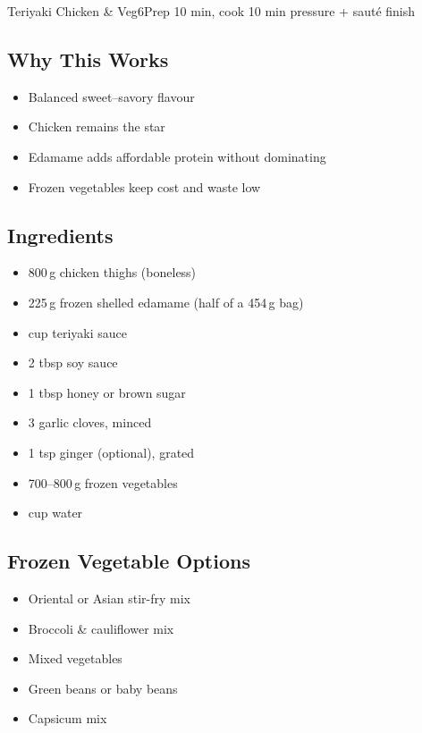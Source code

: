 \begin{recipebox}{Teriyaki Chicken \& Veg}{6}{Prep 10 min, cook 10 min pressure + sauté finish}
\subsection*{Why This Works}
\begin{itemize}
    \item Balanced sweet--savory flavour
    \item Chicken remains the star
    \item Edamame adds affordable protein without dominating
    \item Frozen vegetables keep cost and waste low
\end{itemize}

\subsection*{Ingredients}
\begin{itemize}
    \item 800\,g chicken thighs (boneless)
    \item 225\,g frozen shelled edamame (half of a 454\,g bag)
    \item {} cup teriyaki sauce
    \item 2 tbsp soy sauce
    \item 1 tbsp honey or brown sugar
    \item 3 garlic cloves, minced
    \item 1 tsp ginger (optional), grated
    \item 700--800\,g frozen vegetables
    \item {} cup water
\end{itemize}

\subsection*{Frozen Vegetable Options}
\begin{itemize}
    \item Oriental or Asian stir-fry mix
    \item Broccoli \& cauliflower mix
    \item Mixed vegetables
    \item Green beans or baby beans
    \item Capsicum mix
\end{itemize}


\end{recipebox}
